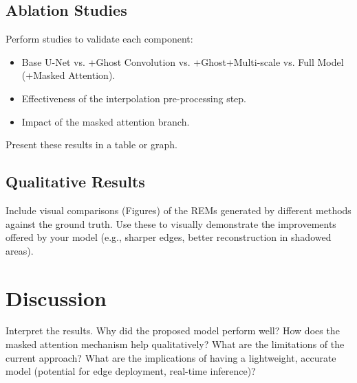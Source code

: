 \documentclass[conference]{IEEEtran}
\begin{document}
\subsection{Ablation Studies}
Perform studies to validate each component:
\begin{itemize}
    \item Base U-Net vs. +Ghost Convolution vs. +Ghost+Multi-scale vs. Full Model (+Masked Attention).
    \item Effectiveness of the interpolation pre-processing step.
    \item Impact of the masked attention branch.
\end{itemize}
Present these results in a table or graph.
\subsection{Qualitative Results}
Include visual comparisons (Figures) of the REMs generated by different methods against the 
ground truth. Use these to visually demonstrate the improvements offered by your model (e.g., sharper
 edges, better reconstruction in shadowed areas).

\section{Discussion}
Interpret the results. Why did the proposed model perform well? How does the masked 
attention mechanism help qualitatively? What are the limitations of the current approach? What 
are the implications of having a lightweight, accurate model (potential for edge deployment, 
real-time inference)?

\end{document}
